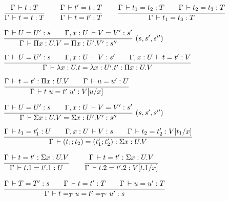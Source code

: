 \documentclass[a4paper,english]{lipics-utf8x}
\begin{document}

  \begin{center}
  \(
    \ru{\Gamma \der t : T
      }{\Gamma \der t = t : T}
    \qquad
    \ru{\Gamma \der t' = t : T
      }{\Gamma \der t = t' : T}
    \qquad
    \ru{\Gamma \der t_1 = t_2 : T \qquad
        \Gamma \der t_2 = t_3 : T
      }{\Gamma \der t_1 = t_3 : T}
  \)
  \end{center}


  \begin{center}
  \(
    \rux{\Gamma \der U = U' : s \qquad
         \Gamma, x:U \der V = V' : s'
       }{\Gamma \der \Pi x:U.V = \Pi x:U'.V' : s''
       }{(s,s',s'')}
  \)
  \end{center}

  \begin{center}
  \(
    \ru{\Gamma \der U = U' : s \qquad
        \Gamma, x:U \der V : s' \qquad
        \Gamma, x:U \der t = t' : V
      }{\Gamma \der \lambda x:U.t = \lambda x:U'.t' : \Pi x:U.V}
  \)
  \end{center}

  \begin{center}
  \(
    \ru{\Gamma \der t = t' : \Pi x:U.V \qquad
        \Gamma \der u = u' : U
      }{\Gamma \der t~u = t'~u' : V[u/x]}
  \)
  \end{center}

  \begin{center}
  \(
    \rux{\Gamma \der U = U' : s \qquad
         \Gamma, x:U \der V = V' : s'
       }{\Gamma \der \Sigma x:U.V = \Sigma x:U'.V' : s''
       }{(s,s',s'')}
  \)
  \end{center}

  \begin{center}
  \(
    \ru{\Gamma \der t_1 = t'_1 : U \qquad
        \Gamma, x:U \der V : s \qquad
        \Gamma \der t_2 = t'_2 : V[t_1/x]
      }{\Gamma \der (t_1;t_2) = (t'_1;t'_2) : \Sigma x:U.V}
  \)
  \end{center}

  \begin{center}
  \(
    \ru{\Gamma \der t = t' : \Sigma x:U.V
      }{\Gamma \der t.1 = t'.1 : U}
    \qquad
    \ru{\Gamma \der t = t' : \Sigma x:U.V
      }{\Gamma \der t.2 = t'.2 : V[t.1/x]}
  \)
  \end{center}

  \begin{center}
  \(
    \ru{\Gamma \der T = T' : s \qquad
        \Gamma \der t = t' : T \qquad
        \Gamma \der u = u' : T
      }{\Gamma \der t =_T u = t' =_{T'} u' : s}
  \)
  \end{center}
\end{document}
